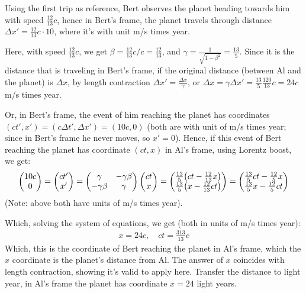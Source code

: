 \documentclass{article}
\DeclarePairedDelimiter{\paran}{(}{)}%
\begin{document}
Using the first trip as reference, Bert observes the planet heading towards him with speed $\frac{12}{13}c$, hence in Bert's frame, the planet travels through distance $\Delta x' = \frac{12}{13}c \cdot 10$, where it's with unit m/s times year.

Here, with speed $\frac{12}{13}c$, we get $\beta = \frac{12}{13}c/c = \frac{12}{13}$, and $\gamma = \frac{1}{\sqrt{1-\beta^2}} = \frac{13}{5}$. Since it is the distance that is traveling in Bert's frame, if the original distance (between Al and the planet) is $\Delta x$, by length contraction $\Delta x' = \frac{\Delta x}{\gamma}$, or $\Delta x=\gamma\Delta x' = \frac{13}{5}\frac{120}{13}c = 24c$ m/s times year.

Or, in Bert's frame, the event of him reaching the planet has coordinates $(ct', x') = (c\Delta t', \Delta x') = (10c, 0)$ (both are with unit of m/s times year; since in Bert's frame he never moves, so $x'=0$). Hence, if this event of Bert reaching the planet has coordinate $(ct, x)$ in Al's frame, using Lorentz boost, we get:
\begin{align}
    \begin{pmatrix}
        10c\\
        0
    \end{pmatrix} = \begin{pmatrix}
        ct'\\x'
    \end{pmatrix} = \begin{pmatrix}
        \gamma & -\gamma\beta\\
        -\gamma\beta & \gamma
    \end{pmatrix}\begin{pmatrix}
        ct\\x
    \end{pmatrix} = \begin{pmatrix}
        \frac{13}{5}\paran*{ct - \frac{12}{13}x}\\
        \frac{13}{5}\paran*{x - \frac{12}{13}ct}
    \end{pmatrix} = \begin{pmatrix}
        \frac{13}{5}ct - \frac{12}{5}x\\
        \frac{13}{5}x - \frac{12}{5}ct
    \end{pmatrix}
\end{align}
(Note: above both have units of m/s times year).

Which, solving the system of equations, we get (both in units of m/s times year):
\begin{align}
    x= 24c,\quad ct = \frac{313}{13}c
\end{align}
Which, this is the coordinate of Bert reaching the planet in Al's frame, which the $x$ coordinate is the planet's distance from Al. The answer of $x$ coincides with length contraction, showing it's valid to apply here. Transfer the distance to light year, in Al's frame the planet has coordinate $x=24$ light years.
\end{document}
